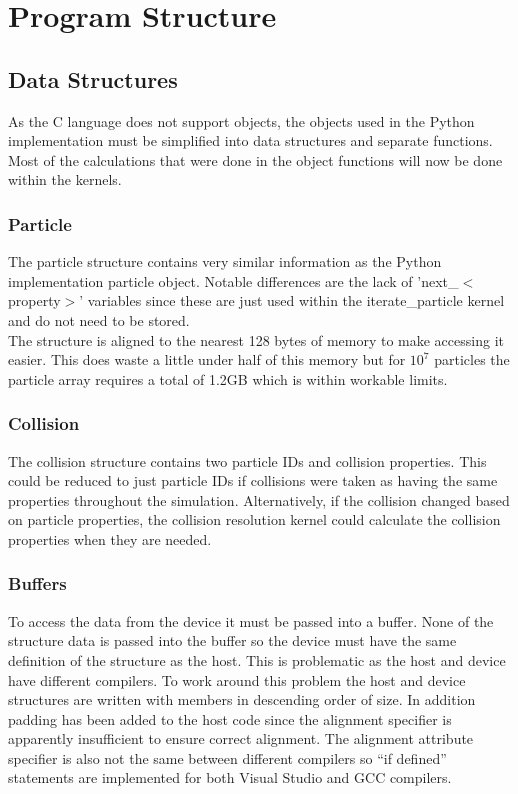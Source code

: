 \documentclass[10pt,a4paper,titlepage]{report}
\begin{document}
\section{Program Structure}
\subsection{Data Structures}
As the C language does not support objects, the objects used in the Python implementation must be simplified into data structures and separate functions. Most of the calculations that were done in the object functions will now be done within the kernels.
\subsubsection{Particle}
The particle structure contains very similar information as the Python implementation particle object. Notable differences are the lack of 'next\_$<$property$>$' variables since these are just used within the iterate\_particle kernel and do not need to be stored.
\\The structure is aligned to the nearest 128 bytes of memory to make accessing it easier. This does waste a little under half of this memory but for $10^7$ particles the particle array requires a total of 1.2GB which is within workable limits.
\subsubsection{Collision}
The collision structure contains two particle IDs and collision properties. This could be reduced to just particle IDs if collisions were taken as having the same properties throughout the simulation. Alternatively, if the collision changed based on particle properties, the collision resolution kernel could calculate the collision properties when they are needed.
\subsubsection{Buffers}
To access the data from the device it must be passed into a buffer. None of the structure data is passed into the buffer so the device must have the same definition of the structure as the host. This is problematic as the host and device have different compilers. To work around this problem the host and device structures are written with members in descending order of size. In addition padding has been added to the host code %
 since the alignment specifier is apparently insufficient to ensure correct alignment. The alignment attribute specifier is also not the same between different compilers so ``if defined'' statements are implemented for both Visual Studio and GCC compilers.
\end{document}

